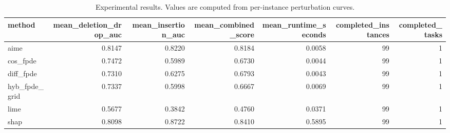 \begin{table}[t]
\caption{Experimental results. Values are computed from per-instance perturbation curves.}
\label{tab:main_results_computed}
\centering
\begin{tabular}{lrrrrrr}
\toprule
method & mean\_deletion\_drop\_auc & mean\_insertion\_auc & mean\_combined\_score & mean\_runtime\_seconds & completed\_instances & completed\_tasks \\
\midrule
aime & 0.8147 & 0.8220 & 0.8184 & 0.0058 & 99 & 1 \\
cos\_fpde & 0.7472 & 0.5989 & 0.6730 & 0.0044 & 99 & 1 \\
diff\_fpde & 0.7310 & 0.6275 & 0.6793 & 0.0043 & 99 & 1 \\
hyb\_fpde\_grid & 0.7337 & 0.5998 & 0.6667 & 0.0069 & 99 & 1 \\
lime & 0.5677 & 0.3842 & 0.4760 & 0.0371 & 99 & 1 \\
shap & 0.8098 & 0.8722 & 0.8410 & 0.5895 & 99 & 1 \\
\bottomrule
\end{tabular}

\end{table}
